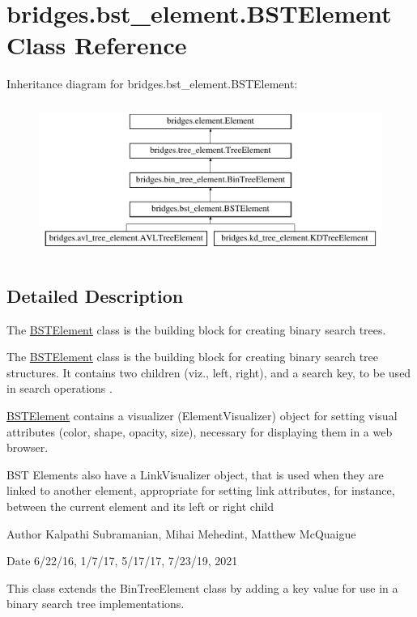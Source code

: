 \hypertarget{classbridges_1_1bst__element_1_1_b_s_t_element}{}\section{bridges.\+bst\+\_\+element.\+B\+S\+T\+Element Class Reference}
\label{classbridges_1_1bst__element_1_1_b_s_t_element}
Inheritance diagram for bridges.\+bst\+\_\+element.\+B\+S\+T\+Element\+:\begin{figure}[H]
\begin{center}
\leavevmode
\includegraphics[height=5.000000cm]{classbridges_1_1bst__element_1_1_b_s_t_element}
\end{center}
\end{figure}


\subsection{Detailed Description}
The \hyperlink{classbridges_1_1bst__element_1_1_b_s_t_element}{B\+S\+T\+Element} class is the building block for creating binary search trees. 

The \hyperlink{classbridges_1_1bst__element_1_1_b_s_t_element}{B\+S\+T\+Element} class is the building block for creating binary search tree structures. It contains two children (viz., left, right), and a search key, to be used in search operations .

\hyperlink{classbridges_1_1bst__element_1_1_b_s_t_element}{B\+S\+T\+Element} contains a visualizer (Element\+Visualizer) object for setting visual attributes (color, shape, opacity, size), necessary for displaying them in a web browser.

B\+ST Elements also have a Link\+Visualizer object, that is used when they are linked to another element, appropriate for setting link attributes, for instance, between the current element and its left or right child

\begin{DoxyAuthor}{Author}
Kalpathi Subramanian, Mihai Mehedint, Matthew Mc\+Quaigue
\end{DoxyAuthor}
\begin{DoxyDate}{Date}
6/22/16, 1/7/17, 5/17/17, 7/23/19, 2021
\end{DoxyDate}
This class extends the Bin\+Tree\+Element class by adding a \textquotesingle{}key\textquotesingle{} value for use in a binary search tree implementations.

